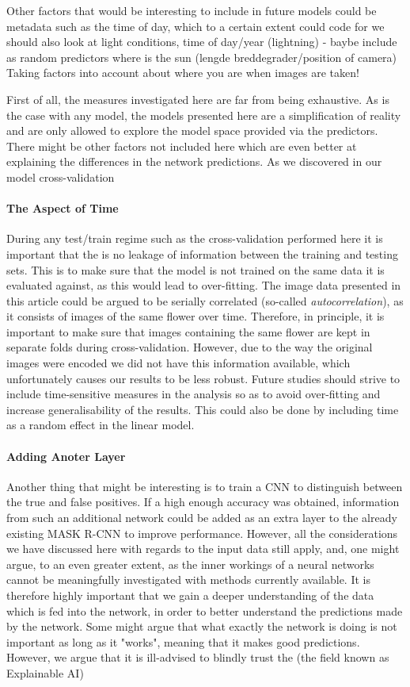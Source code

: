 \documentclass[12pt]{article}
\begin{document}
Other factors that would be interesting to include in future models could be metadata such as the time of day, which to a certain extent could code for 
we should also look at light conditions, time of day/year (lightning) - baybe include as random predictors
where is the sun (lengde breddegrader/position of camera)
Taking factors into account about where you are when images are taken!

First of all, the measures investigated here are far from being exhaustive. As is the case with any model, the models presented here are a simplification of reality and are only allowed to explore the model space provided via the predictors. There might be other factors not included here which are even better at explaining the differences in the network predictions. As we discovered in our model cross-validation 

\paragraph{The Aspect of Time}
During any test/train regime such as the cross-validation performed here it is important that the is no leakage of information between the training and testing sets. This is to make sure that the model is not trained on the same data it is evaluated against, as this would lead to over-fitting. The image data presented in this article could be argued to be serially correlated (so-called \textit{autocorrelation}), as it consists of images of the same flower over time. Therefore, in principle, it is important to make sure that images containing the same flower are kept in separate folds during cross-validation. However, due to the way the original images were encoded we did not have this information available, which unfortunately causes our results to be less robust. Future studies should strive to include time-sensitive measures in the analysis so as to avoid over-fitting and increase generalisability of the results. This could also be done by including time as a random effect in the linear model.

\paragraph{Adding Anoter Layer}
Another thing that might be interesting is to train a CNN to distinguish between the true and false positives. If a high enough accuracy was obtained, information from such an additional network could be added as an extra layer to the already existing MASK R-CNN to improve performance. However, all the considerations we have discussed here with regards to the input data still apply, and, one might argue, to an even greater extent, as the inner workings of a neural networks cannot be meaningfully investigated with methods currently available. It is therefore highly important that we gain a deeper understanding of the data which is fed into the network, in order to better understand the predictions made by the network.
Some might argue that what exactly the network is doing is not important as long as it "works", meaning that it makes good predictions. However, we argue that it is ill-advised to blindly trust the (the field known as Explainable AI)
\end{document}

